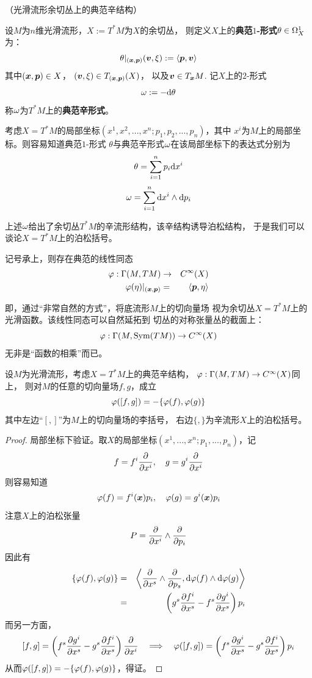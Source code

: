 \begin{Example}（光滑流形余切丛上的典范辛结构）

设$M$为$n$维光滑流形，$X:=T^*M$为$X$的余切丛，
则定义$X$上的\textbf{典范$1$-形式}$\theta\in\Omega^1_X$为：
$$\theta|_{(\boldsymbol{x},\boldsymbol{p})}(\boldsymbol{v},\xi):=\langle \boldsymbol{p},\boldsymbol{v}\rangle$$
其中$(\boldsymbol{x},\boldsymbol{p})\in X$，
$(\boldsymbol{v},\xi)\in T_{(\boldsymbol{x},\boldsymbol{p})}(X)$，
以及$\boldsymbol{v}\in T_{\boldsymbol{x}}M$.
记$X$上的$2$-形式
$$\omega:=-\mathrm{d}\theta$$
称$\omega$为$T^*M$上的\textbf{典范辛形式}。
\end{Example}

考虑$X=T^*M$的局部坐标$(x^1,x^2,...,x^n;p_1,p_2,...,p_n)$，其中
$x^i$为$M$上的局部坐标。则容易知道典范$1$-形式
$\theta$与典范辛形式$\omega$在该局部坐标下的表达式分别为
$$\theta=\sum_{i=1}^np_i\mathrm{d} x^i$$
$$\omega=\sum_{i=1}^n\mathrm{d} x^i\wedge\mathrm{d} p_i$$

上述$\omega$给出了余切丛$T^*M$的辛流形结构，该辛结构诱导泊松结构，
于是我们可以谈论$X=T^*M$上的泊松括号。

\begin{rem}
记号承上，则存在典范的线性同态
\begin{eqnarray*}
\varphi:\Gamma(M,TM)&\to& C^{\infty}(X)\\
\varphi(\eta)|_{(\boldsymbol{x},\boldsymbol{p})}&=&\langle\boldsymbol{p},\eta\rangle
\end{eqnarray*}
\label{切向量场视为余切丛上的光滑函数}
\end{rem}

即，通过“非常自然的方式”，将底流形$M$上的切向量场
视为余切丛$X=T^*M$上的光滑函数。该线性同态可以自然延拓到
切丛的对称张量丛的截面上：
$$\varphi:\Gamma(M,\operatorname{Sym}(TM))\to C^{\infty}(X)$$
无非是“函数的相乘”而已。

\begin{prop}
设$M$为光滑流形，考虑$X=T^*M$上的典范辛结构，
$\varphi:\Gamma(M,TM)\to C^{\infty}(X)$同上，
则对$M$的任意的切向量场$f,g$，成立
$$\varphi([f,g])=-\{\varphi(f),\varphi(g)\}$$
其中左边“$[,]$”为$M$上的切向量场的李括号，
右边$\{,\}$为辛流形$X$上的泊松括号。
\end{prop}

\begin{proof}
局部坐标下验证。取$X$的局部坐标$(x^1,...,x^n;p_1,...,p_n)$，记
$$f=f^i\frac{\partial } {\partial x^i},\quad g=g^i\frac{\partial } {\partial x^i}$$
则容易知道
$$\varphi(f)=f^i(\boldsymbol{x})p_i,\quad \varphi(g)=g^i(\boldsymbol{x})p_i$$
注意$X$上的泊松张量
$$P=\frac{\partial } {\partial x^i}\wedge\frac{\partial } {\partial p_i}$$
因此有
\begin{eqnarray*}
     \{\varphi(f),\varphi(g)\}
&=&
     \left\langle
       \frac{\partial } {\partial x^s}\wedge\frac{\partial } {\partial p_s}
     ,
       \mathrm{d}\varphi(f)\wedge\mathrm{d}\varphi(g)
     \right\rangle\\
&=&
     \left(
       g^s\frac{\partial f^i} {\partial x^s}
      -f^s\frac{\partial g^i} {\partial x^s}
     \right)
     p_i
\end{eqnarray*}
而另一方面，
$$[f,g]=
\left(
  f^s\frac{\partial g^i} {\partial x^s}
 -g^s\frac{\partial f^i} {\partial x^s}
\right)\frac{\partial } {\partial x^i}
\quad\Longrightarrow\quad
\varphi([f,g])=
\left(
  f^s\frac{\partial g^i} {\partial x^s}
 -g^s\frac{\partial f^i} {\partial x^s}
\right)p_i
$$
从而$\varphi([f,g])=-\{\varphi(f),\varphi(g)\}$，得证。
\end{proof}

